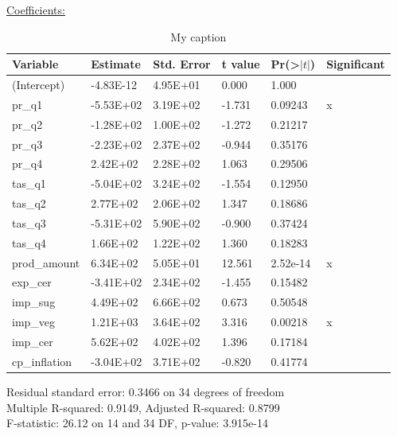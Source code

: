 \documentclass[12pt,a4paper,english]{article}
\begin{document}
\underline{Coefficients:}
\FloatBarrier
\begin{table}[!htbp]
\centering
\begin{tabular}{llllll}
\hline
Variable      & Estimate  & Std. Error & t value & Pr(\textgreater$|t|$) & Significant \\ \hline
(Intercept)   & -4.83E-12 & 4.95E+01   & 0.000   & 1.000             &             \\
pr\_q1        & -5.53E+02 & 3.19E+02   & -1.731  & 0.09243             & x           \\
pr\_q2        & -1.28E+02 & 1.00E+02   & -1.272  & 0.21217             &             \\
pr\_q3        & -2.23E+02 & 2.37E+02   & -0.944  & 0.35176             &             \\
pr\_q4        & 2.42E+02  & 2.28E+02   & 1.063   & 0.29506             &             \\
tas\_q1       & -5.04E+02 & 3.24E+02   & -1.554  & 0.12950             &             \\
tas\_q2       & 2.77E+02  & 2.06E+02   & 1.347   & 0.18686             &             \\
tas\_q3       & -5.31E+02 & 5.90E+02   & -0.900  & 0.37424             &             \\
tas\_q4       & 1.66E+02  & 1.22E+02   & 1.360   & 0.18283             &             \\
prod\_amount  & 6.34E+02  & 5.05E+01   & 12.561  & 2.52e-14            & x           \\
exp\_cer      & -3.41E+02 & 2.34E+02   & -1.455  & 0.15482             &             \\
imp\_sug      & 4.49E+02  & 6.66E+02   & 0.673   & 0.50548             &             \\
imp\_veg      & 1.21E+03  & 3.64E+02   & 3.316   & 0.00218             & x           \\
imp\_cer      & 5.62E+02  & 4.02E+02   & 1.396   & 0.17184             &             \\
cp\_inflation & -3.04E+02 & 3.71E+02   & -0.820  & 0.41774             &            \\ \hline
\end{tabular}
\caption{My caption}
\label{my-label}
\end{table}
\FloatBarrier
Residual standard error: 0.3466 on 34 degrees of freedom\\
Multiple R-squared:  0.9149, Adjusted R-squared:  0.8799 \\
F-statistic: 26.12 on 14 and 34 DF,  p-value: 3.915e-14
\end{document}
